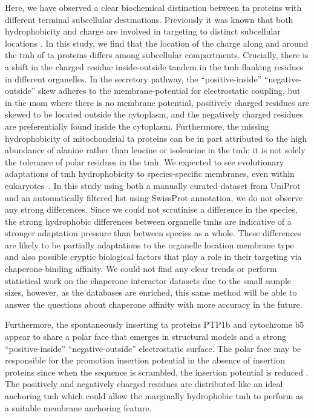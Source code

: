 Here, we have observed a clear biochemical distinction between \gls{ta} proteins with different terminal subcellular destinations.
Previously it was known that both hydrophobicity and charge are involved in targeting to distinct subcellular locations \cite{Costello2017}.
In this study, we find that the location of the charge along and around the \gls{tmh} of \gls{ta} proteins differs among subcellular compartments.
Crucially, there is a shift in the charged residue inside\--outside tandem in the \gls{tmh} flanking residues in different organelles.
In the secretory pathway, the ``positive\--inside'' ``negative\--outside'' skew adheres to the membrane\--potential for electrostatic coupling, but in the \gls{mom} where there is no membrane potential, positively charged residues are skewed to be located outside the cytoplasm, and the negatively charged residues are preferentially found inside the cytoplasm.
Furthermore, the missing hydrophobicity of mitochondrial \gls{ta} proteins can be in part attributed to the high abundance of alanine rather than leucine or isoleucine in the \gls{tmh}; it is not solely the tolerance of polar residues in the \gls{tmh}.
We expected to see evolutionary adaptations of \gls{tmh} hydrophobicity to species-specific membranes, even within eukaryotes~\cite{Baker2017, Sharpe2010}.
In this study using both a manually curated dataset from UniProt and an automatically filtered list using SwissProt annotation, we do not observe any strong differences.
Since we could not scrutinise a difference in the species, the strong hydrophobic differences between organelle \gls{tmh}s are indicative of a stronger adaptation pressure than between species as a whole.
These differences are likely to be partially adaptations to the organelle location membrane type and also possible cryptic biological factors that play a role in their targeting via chaperone\--binding affinity.
We could not find any clear trends or perform statistical work on the chaperone interactor datasets due to the small sample sizes, however, as the databases are enriched, this same method will be able to answer the questions about chaperone affinity with more accuracy in the future.

Furthermore, the spontaneously inserting \gls{ta} proteins PTP1b and cytochrome b5 appear to share a polar face that emerges in structural models and a strong ``positive\--inside'' ``negative\--outside'' electrostatic surface.
The polar face may be responsible for the promotion insertion potential in the absence of insertion proteins since when the sequence is scrambled, the insertion potential is reduced \cite{Brambillasca2006}.
The positively and negatively charged residues are distributed like an ideal anchoring \gls{tmh} \cite{Baker2017} which could allow the marginally hydrophobic \gls{tmh} to perform as a suitable membrane anchoring feature.
